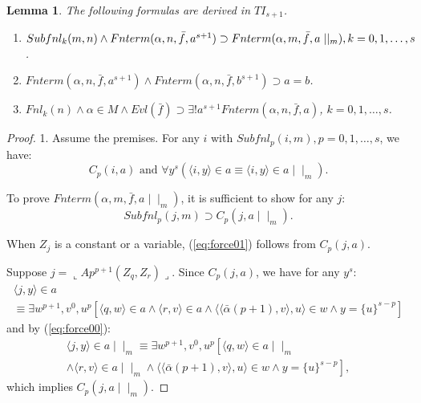 \documentclass{asl}
\newtheorem{lemma}{Lemma}[section]
\theoremstyle{definition}
\begin{document}
\begin{lemma}
The following formulas are derived in $TI_{s+1}$.
\begin{enumerate}
\item $Subfnl_k(m,n)\wedge Fnterm(\alpha,n,\bar{f},a^{s+1})\supset Fnterm(\alpha,m,\bar{f},a\mid\mid_m), 
\\
k=0,1,\ldots,s$.
\medskip
\item $Fnterm(\alpha,n,\bar{f},a^{s+1})\wedge Fnterm(\alpha,n,\bar{f},b^{s+1})\supset a=b$.
\medskip
\item $Fnl_k(n)\wedge\alpha\in M\wedge Evl(\bar{f})\supset\exists ! a^{s+1} Fnterm(\alpha,n,\bar{f},a)$, $k=0,1,\ldots,s$.
\end{enumerate}
\label{lemma:frc2}
\end{lemma}
\begin{proof}
1. Assume the premises. For any $i$ with $Subfnl_p(i,m),p=0,1,\ldots,s$, we have:
\begin{equation}
C_p(i,a) \text{ and }\forall y^s\left(\langle i,y\rangle\in a\equiv\langle i,y\rangle\in a\mid\mid_m \right).
\label{eq:force00}
\end{equation}

To prove $Fnterm(\alpha,m,\bar{f},a\mid\mid_m)$, it is sufficient to show for any $j$:
\begin{equation}
Subfnl_p(j,m)\supset C_p(j,a\mid\mid_m).
\label{eq:force01}
\end{equation}

When $Z_j$ is a constant or a variable, (\ref{eq:force01}) follows from $C_p(j,a)$. 

Suppose $j=\llcorner Ap^{p+1}(Z_q,Z_r)\lrcorner$. Since $C_p(j,a)$, we have for any $y^s$:
\begin{multline*}
\langle j,y\rangle\in a
\\
\equiv\exists w^{p+1}, v^0,u^p\left[ \langle q,w\rangle\in a\wedge\langle r,v\rangle\in a\wedge\langle\langle \bar{\alpha}(p+1),v\rangle,u\rangle\in w\wedge y=\lbrace u\rbrace^{s-p}\right] 
\end{multline*}
and by (\ref{eq:force00}):
\begin{multline*}
\langle j,y\rangle\in a\mid\mid_m
\equiv
\exists w^{p+1}, v^0,u^p\left[ \langle q,w\rangle\in a\mid\mid_m
\right.
\\
\left.
\wedge\langle r,v\rangle\in a\mid\mid_m\wedge\langle\langle \bar{\alpha}(p+1),v\rangle,u\rangle\in w\wedge y=\lbrace u\rbrace^{s-p}\right], 
\end{multline*}
which implies $C_p(j,a\mid\mid_m)$.


\end{proof}
\end{document}
